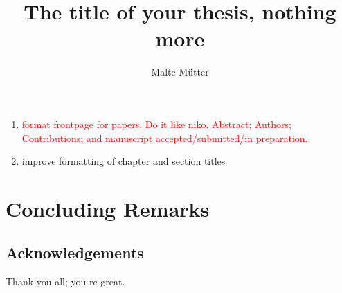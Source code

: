 \documentclass{thesis}
\title{The title of your thesis, nothing more}
\author{Malte Mütter}
\date{} %
\begin{document}
\frontmatter

\begin{summaryspacing}
  \tableofcontents*
\end{summaryspacing}

\pagebreak
\begin{enumerate}
  \item \textcolor{red}{format frontpage for papers. Do it like niko. Abstract; Authors; Contributions; and manuscript accepted/submitted/in preparation.}
  \item improve formatting of chapter and section titles
\end{enumerate}


\mainmatter
{}


%
%
\chapter{Concluding Remarks}

\section*{Acknowledgements}
Thank you all; you re great.
\end{document}
